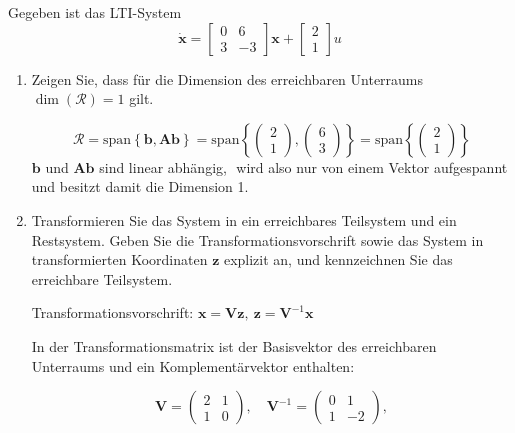 \documentclass[crop=false]{standalone}
\begin{document}
\begin{task}
Gegeben ist das LTI-System
\[
\dot{\mathbf{x}}=\left[\begin{array}{cc}{0} & {6} \\ {3} & {-3}\end{array}\right] \mathbf{x}+\left[\begin{array}{l}{2} \\ {1}\end{array}\right] u
\]
 \begin{enumerate}[i]
     \item Zeigen Sie, dass für die Dimension des erreichbaren Unterraums $\operatorname{dim}(\mathcal{R})=1$ gilt.
     \begin{solution}
     \[\mathcal{R} = \text{span}\left\{\mathbf{b}, \mathbf{Ab} \right\}
     =
     \text{span}\left\{
     \begin{pmatrix}
     2\\1
     \end{pmatrix},
     \begin{pmatrix}
     6\\3
     \end{pmatrix}
     \right\}
     =
     \text{span}\left\{
     \begin{pmatrix}
     2\\1
     \end{pmatrix}
     \right\}
     \]
     $\mathbf{b}$ und $\mathbf{Ab}$ sind linear abhängig, $\mathcal{}$ wird also nur von einem Vektor aufgespannt und besitzt damit die Dimension 1.
     \end{solution}
     \item Transformieren Sie das System in ein erreichbares Teilsystem und ein Restsystem.
Geben Sie die Transformationsvorschrift sowie das System in transformierten
Koordinaten $\mathbf{z}$ explizit an, und kennzeichnen Sie das erreichbare Teilsystem.
\begin{solution}
 Transformationsvorschrift: $\mathbf{x}=\mathbf{V} \mathbf{z}, \ \mathbf{z}=\mathbf{V}^{-1} \mathbf{x}$
 
 In der Transformationsmatrix ist der Basisvektor des erreichbaren Unterraums und ein Komplementärvektor enthalten:
 
 \[\mathbf{V} = 
 \begin{pmatrix}
 2 & 1 \\
 1 & 0
 \end{pmatrix}, \quad 
 \mathbf{V}^{-1} = 
 \begin{pmatrix}
 0 & 1 \\
 1 & -2
 \end{pmatrix},
 \]
 

\end{solution}
\end{enumerate}
\end{task}
\end{document}
